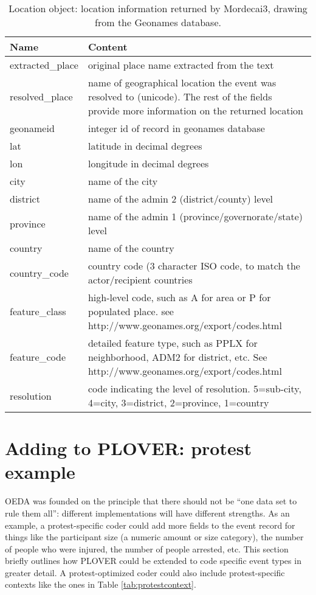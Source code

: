 \documentclass[11pt]{report}
\begin{document}
\begin{table}[htp]
\caption{Location object: location information returned by Mordecai3, drawing from the Geonames database. }
\begin{center}
\begin{tabular}{|l|p{10cm}|}
\hline
Name & Content  \\
\hline
extracted\_place & original place name extracted from the text \\
resolved\_place & name of geographical location the event was resolved to (unicode). The rest of the fields provide more information on the returned location\\
geonameid & integer id of record in geonames database \\
lat & latitude in decimal degrees\\
lon & longitude in decimal degrees \\
city & name of the city \\
district & name of the admin 2 (district/county) level \\
province & name of the admin 1 (province/governorate/state) level \\
country & name of the country \\
country\_code & country code (3 character ISO code, to match the actor/recipient countries \\
feature\_class & high-level code, such as A for area or P for populated place. see http://www.geonames.org/export/codes.html\\
feature\_code & detailed feature type, such as PPLX for neighborhood, ADM2 for district, etc. See http://www.geonames.org/export/codes.html \\
resolution & code indicating the level of resolution. 5=sub-city, 4=city, 3=district, 2=province, 1=country \\
\hline
\end{tabular}
\end{center}
\label{tab:locations}

\end{table}


\clearpage

\section{Adding to PLOVER: protest example}\label{sec:adding_to_plover}


OEDA was founded on the principle that there should not be ``one data set to rule them all'': different implementations will have different strengths. As an example, a protest-specific coder could add more fields to the event record for things like the participant size (a numeric amount or size category), the number of people who were injured, the number of people arrested, etc. This section briefly outlines how PLOVER could be extended to code specific event types in greater detail. A protest-optimized coder could also include protest-specific contexts like the ones in Table \ref{tab:protestcontext}.
\end{document}
